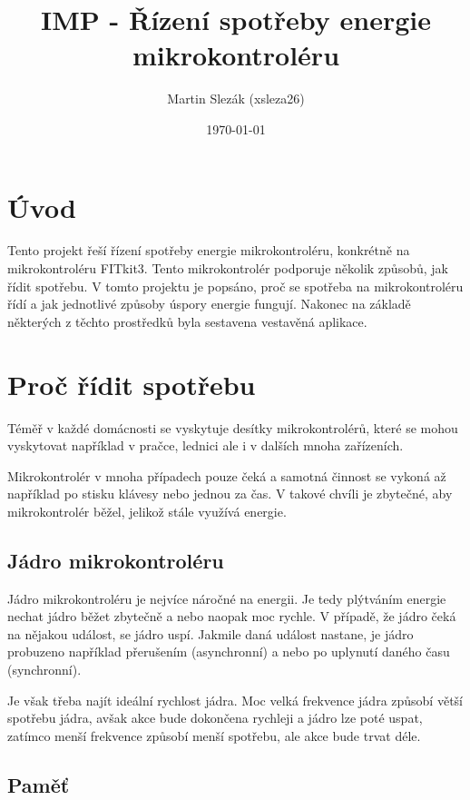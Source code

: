\documentclass{article}
\title{IMP - Řízení spotřeby energie mikrokontroléru}
\author{Martin Slezák (xsleza26)}
\date{\today}
\begin{document}
\maketitle

\newpage

\tableofcontents

\newpage

\section{Úvod}

Tento projekt řeší řízení spotřeby energie mikrokontroléru, konkrétně na
mikrokontroléru FITkit3. Tento mikrokontrolér podporuje několik způsobů, jak
řídit spotřebu. V tomto projektu je popsáno, proč se spotřeba na
mikrokontroléru řídí a jak jednotlivé způsoby úspory energie fungují. Nakonec
na základě některých z těchto prostředků byla sestavena vestavěná aplikace.

\section{Proč řídit spotřebu}

Téměř v každé domácnosti se vyskytuje desítky mikrokontrolérů, které se mohou
vyskytovat například v pračce, lednici ale i v dalších mnoha zařízeních.

Mikrokontrolér v mnoha případech pouze čeká a samotná činnost se vykoná až
například po stisku klávesy nebo jednou za čas. V takové chvíli je zbytečné,
aby mikrokontrolér běžel, jelikož stále využívá energie.

\subsection{Jádro mikrokontroléru}

Jádro mikrokontroléru je nejvíce náročné na energii. Je tedy plýtváním energie
nechat jádro běžet zbytečně a nebo naopak moc rychle. V případě, že jádro čeká
na nějakou událost, se jádro uspí. Jakmile daná událost nastane, je jádro
probuzeno například přerušením (asynchronní) a nebo po uplynutí daného času
(synchronní).

Je však třeba najít ideální rychlost jádra. Moc velká frekvence jádra způsobí
větší spotřebu jádra, avšak akce bude dokončena rychleji a jádro lze poté
uspat, zatímco menší frekvence způsobí menší spotřebu, ale akce bude trvat
déle.

\subsection{Paměť}
\end{document}
